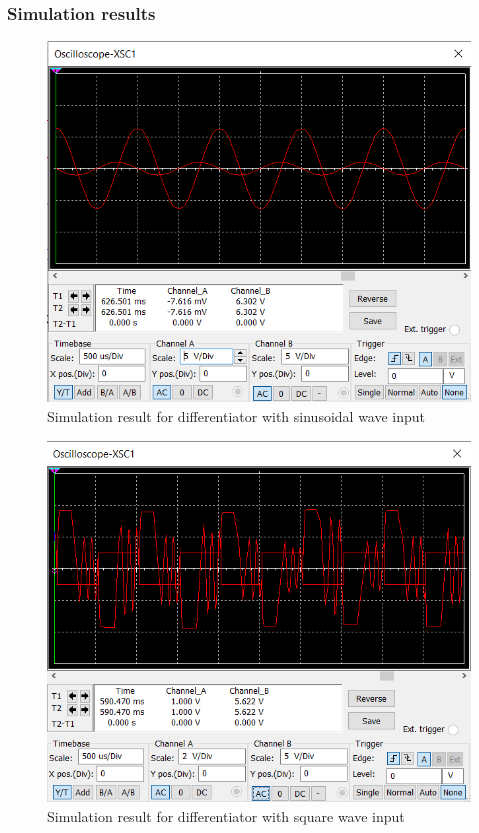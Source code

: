 \documentclass[a4paper, 12pt, english]{article}
\newlength{\simheight}
\begin{document}
\subsubsection{Simulation results}
\begin{figure}[H]
    \centering
    \includegraphics[width=\linewidth, height=0.8\simheight]{images/diff sine.png}
    \caption{Simulation result for differentiator with sinusoidal wave input}
    \label{fig:Simulation result for differentiator with sinusoidal wave input}
\end{figure}
\begin{figure}[H]
    \centering
    \includegraphics[width=\linewidth, height=0.8\simheight]{images/diff square.png}
    \caption{Simulation result for differentiator with square wave input}
    \label{fig:Simulation result for differentiator with square wave input}
\end{figure}
\end{document}
